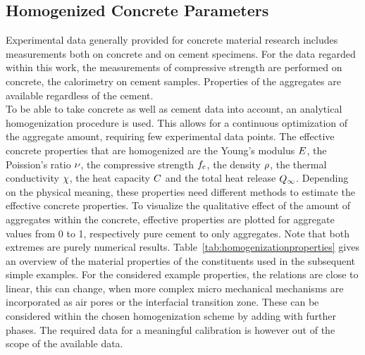\subsection{Homogenized Concrete Parameters}
Experimental data generally provided for concrete material research includes measurements both on concrete and on cement specimens.
For the data regarded within this work, the measurements of compressive strength are performed on concrete, the calorimetry on cement samples.
Properties of the aggregates are available regardless of the cement.\\

To be able to take concrete as well as cement data into account, an analytical homogenization procedure is used.
This allows for a continuous optimization of the aggregate amount, requiring few experimental data points.
The effective concrete properties that are homogenized are the Young's modulus $E$, the Poission's ratio $\nu$, the compressive strength $f_{\text{c}}$, the density $\rho$, the thermal conductivity $\chi$, the heat capacity $C$ and the total heat release $Q_{\infty}$.
Depending on the physical meaning, these properties need different methods to estimate the effective concrete properties.
To visualize the qualitative effect of the amount of aggregates within the concrete, effective properties are plotted for aggregate values from 0 to 1, respectively pure cement to only aggregates.
Note that both extremes are purely numerical results.
\mbox{Table \ref{tab:homogenizationproperties}} gives an overview of the material properties of the constituents used in the subsequent simple examples.
For the considered example properties, the relations are close to linear, this can change, when more complex micro mechanical mechanisms are incorporated as air pores or the interfacial transition zone.
These can be considered within the chosen homogenization scheme by adding with further phases.
The required data for a meaningful calibration is however out of the scope of the available data.
